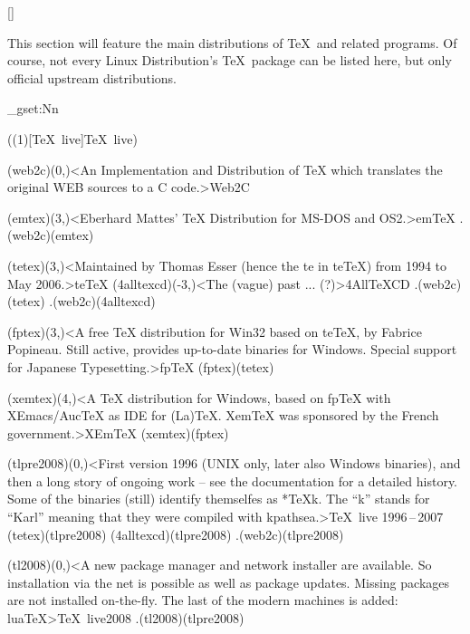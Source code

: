 \clearpage

[\distro]
\parbox{\textwidth}{\normalsize
This section will feature the main distributions of \TeX\ and related programs. Of course, not every Linux Distribution's \TeX\ package can be listed here, but only official upstream distributions.
}

\ExplSyntaxOn
\fp_gset:Nn
\ExplSyntaxOff

\tograph(\tostruct(1)[\TeX\ live]{\TeX\ live}){
	\tonode(web2c)(0,\layer)<An Implementation and Distribution of TeX which translates the original WEB sources to a C code.>{Web2C}
	\steplayer

	\tonode[\histdistro](emtex)(3,\layer)<Eberhard Mattes' TeX Distribution for MS-DOS and OS2.>{em\TeX} %
	\todraw.(web2c)(emtex)
	\steplayer

	\tonode[\histdistro](tetex)(3,\layer)<Maintained by Thomas Esser (hence the te in teTeX) from 1994 to May 2006.>{te\TeX}
	\tonode[\histdistro](4alltexcd)(-3,\layer)<The (vague) past ... (?)>{4All\TeX CD }
	\todraw.(web2c)(tetex)
	\todraw.(web2c)(4alltexcd)
	\steplayer

	\tonode(fptex)(3,\layer)<A free TeX distribution for Win32 based on teTeX, by Fabrice Popineau. Still active, provides up-to-date binaries for Windows. Special support for Japanese Typesetting.>{fp\TeX}
	\todraw(fptex)(tetex)
	\steplayer[-2.5]

	\tonode[\histdistro](xemtex)(4,\layer)<A TeX distribution for Windows, based on fpTeX with XEmacs/AucTeX as IDE for (La)TeX. XemTeX was sponsored by the French government.>{XEm\TeX}
	\todraw(xemtex)(fptex)

	\tonode[\histdistro](tlpre2008)(0,\layer)<First version 1996 (UNIX only, later also Windows binaries), and then a long story of ongoing work – see the documentation for a detailed history. Some of the binaries (still) identify themselfes as *TeXk. The “k” stands for “Karl” meaning that they were compiled with kpathsea.>{\TeX\ live 1996\,–\,2007}
	\todraw(tetex)(tlpre2008)
	\todraw(4alltexcd)(tlpre2008)
	\todraw.(web2c)(tlpre2008)
	\steplayer

	\tonode(tl2008)(0,\layer)<A new package manager and network installer are available. So installation via the net is possible as well as package updates. Missing packages are not installed on-the-fly. The last of the modern machines is added: luaTeX>{\TeX\ live2008}
	\todraw.(tl2008)(tlpre2008)

}
